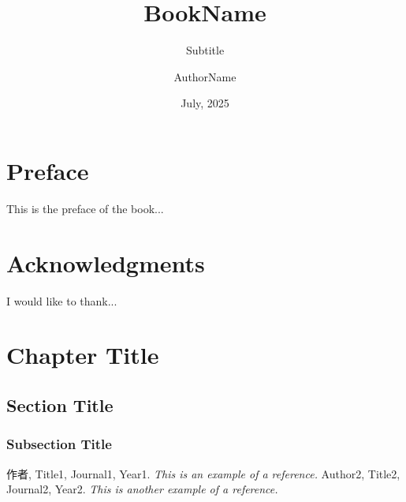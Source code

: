 \documentclass[11pt]{elegantbook}
\title{BookName} %
\subtitle{Subtitle} %
\author{AuthorName} %
\date{July, 2025} %
\institute{Elegant\LaTeX{} Program} %
\begin{document}
\maketitle %

\frontmatter        %
\tableofcontents    %

\chapter{Preface}   %
This is the preface of the book...

\chapter{Acknowledgments}  %
I would like to thank...
\mainmatter         %

\chapter{Chapter Title} %
\section{Section Title} %
\subsection{Subsection Title} %


\begin{thebibliography}{99} 
 作者, Title1, Journal1, Year1. \emph{ This is an example of a reference.}
 Author2, Title2, Journal2, Year2. \emph{ This is another example of a reference.}
\end{thebibliography}
\end{document}
